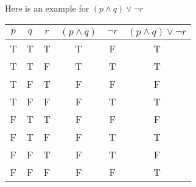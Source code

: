 \documentclass{report}
\begin{document}
    \bigbreak \noindent 
    Here is an example for $(p \land q) \lor \neg r$
    \bigbreak \noindent 
      \begin{center}
          \begin{tabular}{|c|c|c|c|c|c|}
            \hline
            \(p\) & \(q\) & \(r\) & \((p \land q)\) & \(\neg r\) & \((p \land q) \lor \neg r\) \\
            \hline
            T & T & T & T & F & T \\
            \hline 
            T & T & F & T & T & T \\
            \hline
            T & F &T & F &F&F \\
            \hline
            T&F&F&F&T&T \\
            \hline
            F&T&T&F&F&F \\
            \hline 
            F&T&F&F&T&T \\
            \hline
            F&F&T&F&T&F \\
            \hline
            F&F&F&F&F&T \\
            \hline
        \end{tabular}
      \end{center}

      \pagebreak \bigbreak \noindent 
\end{document}

